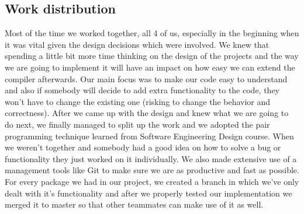 \documentclass[11pt]{article}
\begin{document}
\subsection{Work distribution}
Most of the time we worked together, all 4 of us, especially in the beginning when it was vital given the design decisions which were involved. We knew that spending a little bit more time thinking on the design of the projects and the way we are going to implement it will have an impact on how easy we can extend the compiler afterwards. Our main focus was to make our code easy to understand and also if somebody will decide to add extra functionality to the code, they won't have to change the existing one (risking to change the behavior and correctness). After we came up with the design and knew what we are going to do next, we finally managed to split up the work and we adopted the pair programming technique learned from Software Engineering Design course. When we weren't together and somebody had a good idea on how to solve a bug or functionality they just worked on it individually. We also made extensive use of a management tools like Git to make sure we are as productive and fast as possible. For every package we had in our project, we created a branch in which we've only dealt with it's functionality and after we properly tested our implementation we merged it to master so that other teammates can make use of it as well.
\end{document}
